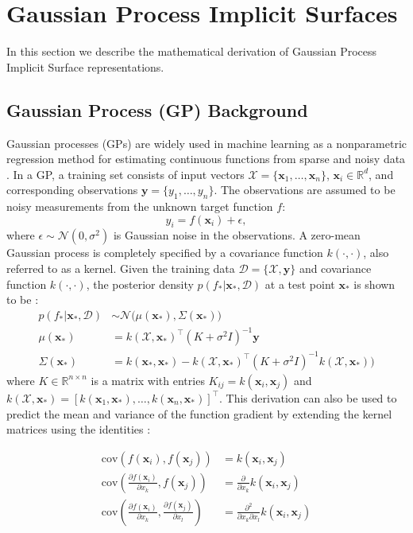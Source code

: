 \documentclass[letterpaper, 10 pt, conference]{ieeeconf}  %
\newcommand{\by}{\mathbf{y}}
\newcommand{\bx}{\mathbf{x}}
\newcommand{\mX}{\mathcal{X}}
\newcommand{\mD}{\mathcal{D}}
\newcommand{\mN}{\mathcal{N}}
\begin{document}

\section{Gaussian Process Implicit Surfaces}

In this section we describe the mathematical derivation of Gaussian Process Implicit Surface representations.

\subsection{Gaussian Process (GP) Background}

Gaussian processes (GPs) are widely used in machine learning as a nonparametric regression method for estimating continuous functions from sparse and noisy data \cite{rasmussen2010gaussian}.
In a GP, a training set consists of input vectors $\mX = \{\bx_1, \ldots, \bx_n\}$, $\bx_i \in \mathbb{R}^d$, and corresponding observations $\by = \{y_1, \ldots, y_n\}$. The observations are assumed to be noisy measurements from the unknown target function $f$:
\begin{equation}
y_i = f(\bx_i) + \epsilon,
\end{equation}
where $\epsilon \sim \mN(0,\sigma^2)$ is Gaussian noise in the observations.
A zero-mean Gaussian process is completely specified by a covariance function $k(\cdot,\cdot)$, also referred to as a kernel.
Given the training data $\mD = \{\mX, \by\}$ and covariance function $k(\cdot,\cdot)$, the posterior density $p(f_*|\bx_*,\mD)$ at a test point $\bx_{*}$ is shown to be \cite{rasmussen2010gaussian}:
\begin{align}
	p(f_*|\bx_*,\mD) &\sim \mN\big(\mu(\bx_*), \Sigma(\bx_*)\big) \label{eq:GPposterior} \\
	\mu(\bx_*) &= k(\mX,\bx_*)^{\intercal}(K + \sigma^2I)^{-1}\by \label{eq:GPmean} \\
	\Sigma(\bx_*) &= k(\bx_*,\bx_*)-k(\mX,\bx_*)^{\intercal}(K+\sigma^2I)^{-1}k(\mX,\bx_*)\big) \label{eq:GPvar}
\end{align}
where $K \in \mathbb{R}^{n \times n}$ is a matrix with entries $K_{ij} = k(\bx_i,\bx_j)$ and $k(\mX,\bx_*) = [k(\bx_1,\bx_*),\ldots,k(\bx_n,\bx_*)]^{\intercal}$. 
This derivation can also be used to predict the mean and variance of the function gradient by extending the kernel matrices using the identities \cite{solak2003derivative}:

\begin{align*}
	\text{cov}\left(f(\bx_i), f(\bx_j) \right) &=  k(\bx_i, \bx_j) \\
	\text{cov}\left(\frac{\partial f (\bx_i)}{\partial x_k}, f(\bx_j) \right) &= \frac{\partial}{\partial x_k} k(\bx_i, \bx_j) \\
	\text{cov}\left(\frac{\partial f (\bx_i)}{\partial x_k}, \frac{\partial f (\bx_j)}{\partial x_l} \right) &= \frac{\partial^2}{\partial x_k \partial x_l} k(\bx_i, \bx_j)
\end{align*}
\end{document}
